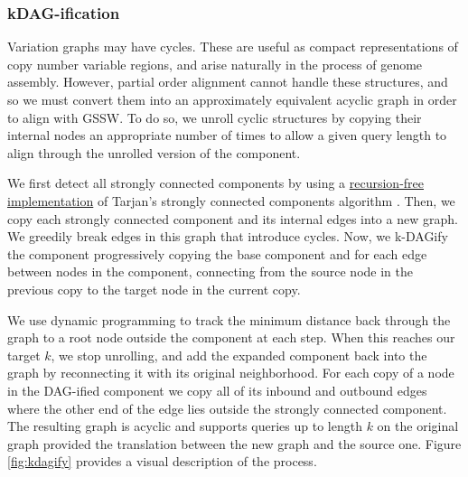 \documentclass[12pt]{article}
\begin{document}
\subsubsection{kDAG-ification}

Variation graphs may have cycles.
These are useful as compact representations of copy number variable regions, and arise naturally in the process of genome assembly.
However, partial order alignment cannot handle these structures, and so we must convert them into an approximately equivalent acyclic graph in order to align with GSSW.
To do so, we unroll cyclic structures by copying their internal nodes an appropriate number of times to allow a given query length to align through the unrolled version of the component.

We first detect all strongly connected components by using a \href{https://github.com/vgteam/vg/blob/fbcb6e62/src/vg.cpp#L3508-L3552}{recursion-free implementation} of Tarjan's strongly connected components algorithm \cite{tarjan1972depth}.
Then, we copy each strongly connected component and its internal edges into a new graph.
We greedily break edges in this graph that introduce cycles.
Now, we k-DAGify the component progressively copying the base component and for each edge between nodes in the component, connecting from the source node in the previous copy to the target node in the current copy.

We use dynamic programming to track the minimum distance back through the graph to a root node outside the component at each step.
When this reaches our target $k$, we stop unrolling, and add the expanded component back into the graph by reconnecting it with its original neighborhood.
For each copy of a node in the DAG-ified component we copy all of its inbound and outbound edges where the other end of the edge lies outside the strongly connected component.
The resulting graph is acyclic and supports queries up to length $k$ on the original graph provided the translation between the new graph and the source one.
Figure \ref{fig:kdagify} provides a visual description of the process.
\end{document}

